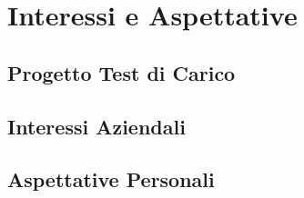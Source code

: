 
\chapter{Interessi e Aspettative}
\label{cap:processi-metodologie}
\begin{comment}
\intro{In questa sezione verranno presentati gli obiettivi del progetto, la pianificazione temporale del periodo di stage, gli interessi aziendali verso i progetti di stage e verso questo progetto nello specifico.\\
In conclusione verrà effettuata una valutazione delle mie aspettative personali.}\\
\end{comment}

\section{Progetto Test di Carico}
\label{sec:progetto-test-di-carico}

\section{Interessi Aziendali}
\label{sec:interessi-aziendali}

\section{Aspettative Personali}
\label{sec:aspettative-personali}

